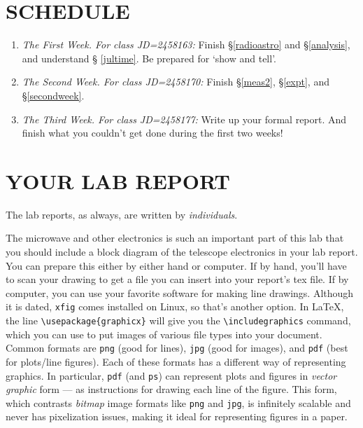 \documentclass[12pt,preprint]{aastex}
\begin{document}
\section{SCHEDULE}
\begin{enumerate}
\item {\it The First Week. For class JD=2458163:} %
Finish \S\ref{radioastro} and \S \ref{analysis}, and understand \S
  \ref{jultime}. Be prepared for `show and tell'.

\item {\it The Second Week. For class JD=2458170:} %
Finish \S \ref{meas2}, \S \ref{expt}, and \S \ref{secondweek}. 

\item {\it The Third Week. For class JD=2458177:} Write up your formal
  report. And finish what you couldn't get done during the first two
  weeks!
\end{enumerate}

\section{YOUR LAB REPORT}

The lab reports, as always, are written by {\it individuals}. 

The microwave and other electronics is such an important part of this
lab that you should include a block diagram of the telescope electronics
in your lab report. You can prepare this either by either hand or
computer. If by hand, you'll have to scan your drawing to get a file you can
insert into your report's tex file. If by computer, you can use your
favorite software for making line drawings.  Although it is dated, {\tt xfig}
comes installed on Linux, so that's another option.  In \LaTeX, the line
{\tt \textbackslash usepackage\{graphicx\}} will give you the {\tt \textbackslash includegraphics} command,
which you can use to put images of various file types into your document.  Common
formats are {\tt png} (good for lines), {\tt jpg} (good for images), and {\tt pdf}
(best for plots/line figures).  Each of these formats has a different way of representing
graphics.  In particular, {\tt pdf} (and {\tt ps}) can represent plots and figures 
in {\it vector graphic} form --- as instructions for drawing each line of the figure.  This 
form, which contrasts {\it bitmap} image formats like {\tt png} and {\tt jpg}, is
infinitely scalable and never has pixelization issues, making it ideal for representing
figures in a paper.
\end{document}
